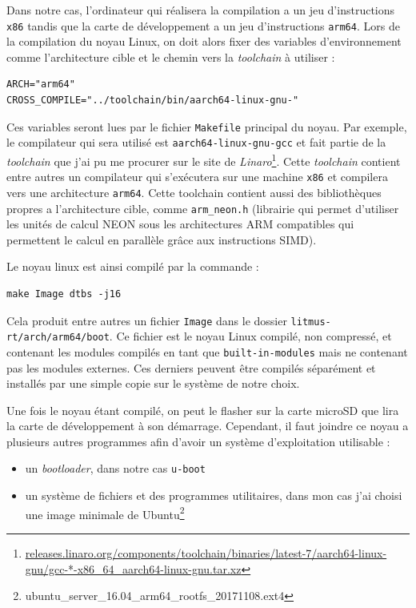 Dans notre cas, l'ordinateur qui réalisera la compilation a un jeu d'instructions \texttt{x86} tandis que la carte de développement a un jeu d'instructions \texttt{arm64}. Lors de la compilation du noyau Linux, on doit alors fixer des variables d’environnement comme l'architecture cible et le chemin vers la \textit{toolchain} à utiliser : 
\begin{lstlisting}[style=command, caption=Variables pour la compilation croisée du noyau Linux]
ARCH="arm64"
CROSS_COMPILE="../toolchain/bin/aarch64-linux-gnu-"
\end{lstlisting}

Ces variables seront lues par le fichier \texttt{Makefile} principal du noyau. Par exemple, le compilateur qui sera utilisé est \texttt{aarch64-linux-gnu-gcc} et fait partie de la \textit{toolchain} que j'ai pu me procurer sur le site de \textit{Linaro}\footnote{\href{https://releases.linaro.org/components/toolchain/binaries/latest-7/aarch64-linux-gnu/gcc-*-x86\_64\_aarch64-linux-gnu.tar.xz}{releases.linaro.org/components/toolchain/binaries/latest-7/aarch64-linux-gnu/gcc-*-x86\_64\_aarch64-linux-gnu.tar.xz}}.
Cette \textit{toolchain} contient entre autres un compilateur qui s’exécutera sur une machine \texttt{x86} et compilera vers une architecture \texttt{arm64}. Cette toolchain contient aussi des bibliothèques propres a l'architecture cible, comme \texttt{arm\_neon.h} (librairie qui permet d'utiliser les unités de calcul NEON sous les architectures ARM compatibles qui permettent le calcul en parallèle grâce aux instructions SIMD).

Le noyau linux est ainsi compilé par la commande :
\begin{lstlisting}[style=command]
    make Image dtbs -j16
\end{lstlisting}
Cela produit entre autres un fichier \texttt{Image} dans le dossier \texttt{litmus-rt/arch/arm64/boot}. Ce fichier est le noyau Linux compilé, non compressé, et contenant les modules compilés en tant que \texttt{built-in-modules} mais ne contenant pas les modules externes. Ces derniers peuvent être compilés séparément et installés par une simple copie sur le système de notre choix. 

Une fois le noyau étant compilé, on peut le flasher sur la carte microSD que lira la carte de développement à son démarrage. Cependant, il faut joindre ce noyau a plusieurs autres programmes afin d'avoir un système d'exploitation utilisable : 
\begin{itemize}
    \item un \textit{bootloader}, dans notre cas \texttt{u-boot}
    \item un système de fichiers et des programmes utilitaires, dans mon cas j'ai choisi une image minimale de Ubuntu\footnote{ubuntu\_server\_16.04\_arm64\_rootfs\_20171108.ext4}
\end{itemize}

